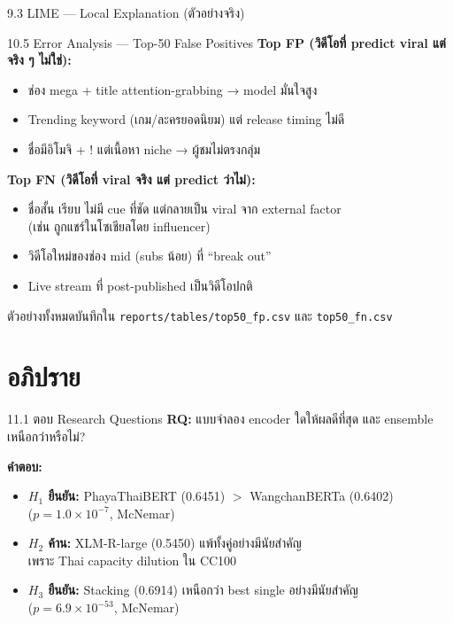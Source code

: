 \documentclass[aspectratio=169,11pt,xcolor=dvipsnames]{beamer}
\newcommand{\hl}[1]{\textcolor{kmitlOrange}{\textbf{#1}}}
\begin{document}
\begin{frame}{9.3 LIME — Local Explanation (ตัวอย่างจริง)}
\begin{center}
\begin{frame}{10.5 Error Analysis — Top-50 False Positives}
  \textbf{Top FP (วิดีโอที่ predict viral แต่จริง ๆ ไม่ใช่):}
  \begin{itemize}
    \item ช่อง mega + title attention-grabbing → model มั่นใจสูง
    \item Trending keyword (เกม/ละครยอดนิยม) แต่ release timing ไม่ดี
    \item ชื่อมีอิโมจิ + ! แต่เนื้อหา niche → ผู้ชมไม่ตรงกลุ่ม
  \end{itemize}
  \vspace{0.4em}
  \textbf{Top FN (วิดีโอที่ viral จริง แต่ predict ว่าไม่):}
  \begin{itemize}
    \item ชื่อสั้น เรียบ ไม่มี cue ที่ชัด แต่กลายเป็น viral จาก external factor\\
      (เช่น ถูกแชร์ในโซเชียลโดย influencer)
    \item วิดีโอใหม่ของช่อง mid (subs น้อย) ที่ ``break out''
    \item Live stream ที่ post-published เป็นวิดีโอปกติ
  \end{itemize}
  \vspace{0.3em}
  \begin{center}
    \scriptsize ตัวอย่างทั้งหมดบันทึกใน \texttt{reports/tables/top50\_fp.csv} และ \texttt{top50\_fn.csv}
  \end{center}
\end{frame}

\section{อภิปราย}

\begin{frame}{11.1 ตอบ Research Questions}
  \textbf{RQ:} แบบจำลอง encoder ใดให้ผลดีที่สุด และ ensemble เหนือกว่าหรือไม่?
  \vspace{0.4em}

  \textbf{คำตอบ:}
  \begin{itemize}
    \item \hl{$H_1$ ยืนยัน:} PhayaThaiBERT (0.6451) $>$ WangchanBERTa (0.6402)\\
      ($p = 1.0 \times 10^{-7}$, McNemar)
    \item \hl{$H_2$ ค้าน:} XLM-R-large (0.5450) แพ้ทั้งคู่อย่างมีนัยสำคัญ\\
      เพราะ Thai capacity dilution ใน CC100
    \item \hl{$H_3$ ยืนยัน:} Stacking (0.6914) เหนือกว่า best single อย่างมีนัยสำคัญ\\
      ($p = 6.9 \times 10^{-53}$, McNemar)
  \end{itemize}
\end{frame}


\end{center}
\end{frame}
\end{document}
